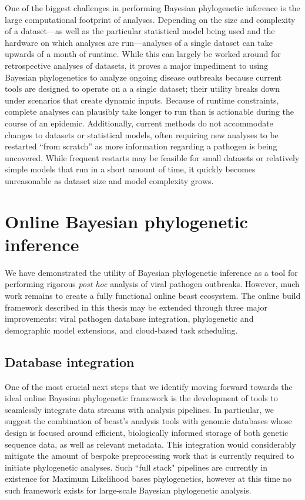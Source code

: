 One of the biggest challenges in performing Bayesian phylogenetic inference is the large computational footprint of analyses.
Depending on the size and complexity of a dataset---as well as the particular statistical model being used and the hardware on which analyses are run---analyses of a single dataset can take upwards of a month of runtime.
While this can largely be worked around for retrospective analyses of datasets, it proves a major impediment to using Bayesian phylogenetics to analyze ongoing disease outbreaks because current tools are designed to operate on a a single dataset; their utility breaks down under scenarios that create dynamic inputs.
Because of runtime constraints, complete analyses can plausibly take longer to run than is actionable during the course of an epidemic.
Additionally, current methods do not accommodate changes to datasets or statistical models, often requiring new analyses to be restarted ``from scratch'' as more information regarding a pathogen is being uncovered.
While frequent restarts may be feasible for small datasets or relatively simple models that run in a short amount of time, it quickly becomes unreasonable as dataset size and model complexity grows.

\section{Online Bayesian phylogenetic inference}

We have demonstrated the utility of Bayesian phylogenetic inference as a tool for performing rigorous \textit{post hoc} analysis of viral pathogen outbreaks.
However, much work remains to create a fully functional online \gls{beast} ecosystem.
The online build framework described in this thesis may be extended through three major improvements: viral pathogen database integration, phylogenetic and demographic model extensions, and cloud-based task scheduling.

\subsection{Database integration}

One of the most crucial next steps that we identify moving forward towards the ideal online Bayesian phylogenetic framework is the development of tools to seamlessly integrate data streams with analysis pipelines.
In particular, we suggest the combination of \gls{beast}'s analysis tools with genomic databases whose design is focused around efficient, biologically informed storage of both genetic sequence data, as well as relevant metadata.
This integration would considerably mitigate the amount of bespoke preprocessing work that is currently required to initiate phylogenetic analyses.
Such ``full stack" pipelines are currently in existence for Maximum Likelihood bases phylogenetics\cite{hadfield2019nextstrain}, however at this time no such framework exists for large-scale Bayesian phylogenetic analysis.

